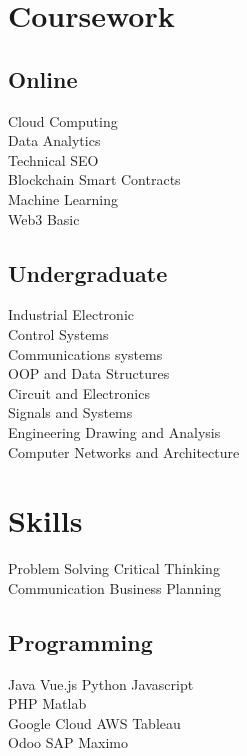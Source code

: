 \documentclass[]{deedy-resume-openfont}
\begin{document}
\begin{minipage}[t]{0.33\textwidth}

\section{Coursework}
\subsection{Online}
Cloud Computing \\
Data Analytics  \\
Technical SEO \\
Blockchain Smart Contracts \\
Machine Learning \\
Web3 Basic
\sectionsep

\subsection{Undergraduate}
Industrial Electronic \\
Control Systems \\
Communications systems \\
OOP and Data Structures \\
Circuit and Electronics \\
Signals and Systems\\
Engineering Drawing and Analysis \\
Computer Networks and Architecture \\



\section{Skills}

Problem Solving \textbullet{}   Critical Thinking \\ Communication\textbullet{} Business Planning \\
\subsection{Programming}
Java \textbullet{}   Vue.js \textbullet{} Python \textbullet{} Javascript \\
PHP \textbullet{} Matlab \\ 
Google Cloud \textbullet{} AWS \textbullet{} Tableau \\
Odoo  \textbullet{} SAP \textbullet{} Maximo 
\sectionsep



%
%

\end{minipage} 
\end{document}

